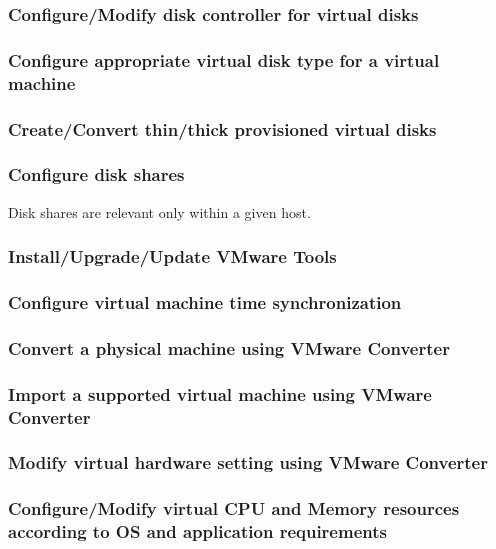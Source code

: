 \subsubsection{Configure/Modify disk controller for virtual disks}

\subsubsection{Configure appropriate virtual disk type for a virtual machine}

\subsubsection{Create/Convert thin/thick provisioned virtual disks}

\subsubsection{Configure disk shares}

Disk shares are relevant only within a given host.

\subsubsection{Install/Upgrade/Update VMware Tools}

\subsubsection{Configure virtual machine time synchronization}

\subsubsection{Convert a physical machine using VMware Converter}

\subsubsection{Import a supported virtual machine using VMware Converter}

\subsubsection{Modify virtual hardware setting using VMware Converter}

\subsubsection{Configure/Modify virtual CPU and Memory resources according to OS and application requirements}

